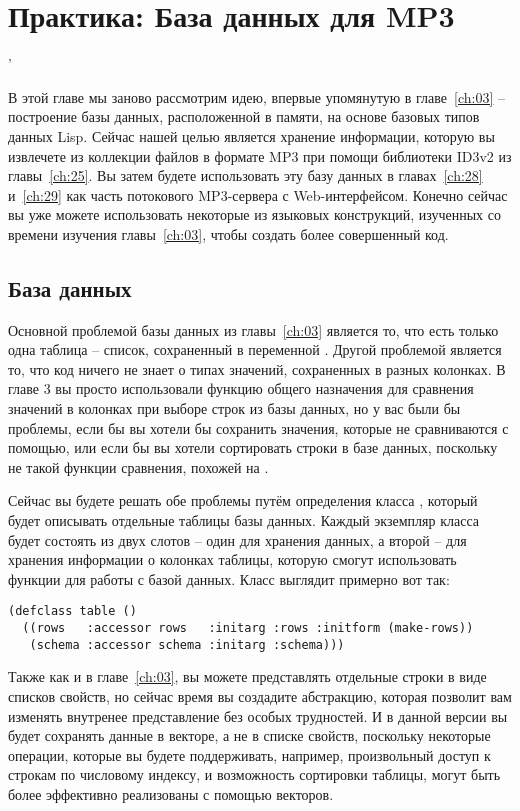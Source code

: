 \chapter{Практика: База данных для MP3}
'\label{ch:27}

В этой главе мы заново рассмотрим идею, впервые упомянутую в главе~\ref{ch:03} --
построение базы данных, расположенной в памяти, на основе базовых типов данных Lisp.
Сейчас нашей целью является хранение информации, которую вы извлечете из коллекции файлов
в формате MP3 при помощи библиотеки ID3v2 из главы~\ref{ch:25}.  Вы затем будете
использовать эту базу данных в главах~\ref{ch:28} и~\ref{ch:29} как часть потокового
MP3-сервера с Web-интерфейсом.  Конечно сейчас вы уже можете использовать некоторые из
языковых конструкций, изученных со времени изучения главы~\ref{ch:03}, чтобы создать более
совершенный код.

\section{База данных}

Основной проблемой базы данных из главы~\ref{ch:03} является то, что есть только одна
таблица -- список, сохраненный в переменной .  Другой проблемой является то,
что код ничего не знает о типах значений, сохраненных в разных колонках.  В главе 3 вы
просто использовали функцию общего назначения  для сравнения значений в
колонках при выборе строк из базы данных, но у вас были бы проблемы, если бы вы хотели бы
сохранить значения, которые не сравниваются с помощью, или если бы вы хотели
сортировать строки в базе данных, поскольку не такой функции сравнения, похожей на
.

Сейчас вы будете решать обе проблемы путём определения класса , который будет
описывать отдельные таблицы базы данных.  Каждый экземпляр класса  будет
состоять из двух слотов -- один для хранения данных, а второй -- для хранения информации о
колонках таблицы, которую смогут использовать функции для работы с базой данных.  Класс
выглядит примерно вот так:

\begin{lstlisting}
(defclass table ()
  ((rows   :accessor rows   :initarg :rows :initform (make-rows))
   (schema :accessor schema :initarg :schema)))
\end{lstlisting}

Также как и в главе~\ref{ch:03}, вы можете представлять отдельные строки в виде списков
свойств, но сейчас время вы создадите абстракцию, которая позволит вам изменять внутренее
представление без особых трудностей. И в данной версии вы будет сохранять данные в
векторе, а не в списке свойств, поскольку некоторые операции, которые вы будете
поддерживать, например, произвольный доступ к строкам по числовому индексу, и возможность
сортировки таблицы, могут быть более эффективно реализованы с помощью векторов.

